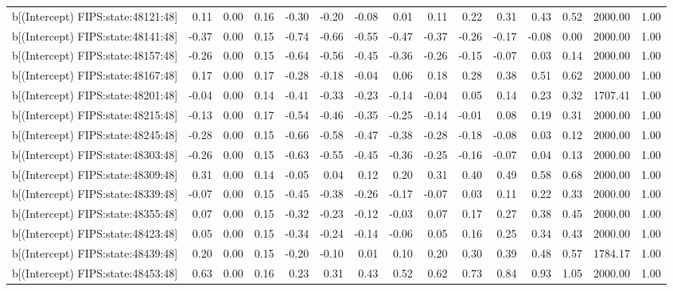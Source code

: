 \begin{table}[ht]
\begin{tabular}{rrrrrrrrrrrrrrr}
  b[(Intercept) FIPS:state:48121:48] & 0.11 & 0.00 & 0.16 & -0.30 & -0.20 & -0.08 & 0.01 & 0.11 & 0.22 & 0.31 & 0.43 & 0.52 & 2000.00 & 1.00 \\ 
  b[(Intercept) FIPS:state:48141:48] & -0.37 & 0.00 & 0.15 & -0.74 & -0.66 & -0.55 & -0.47 & -0.37 & -0.26 & -0.17 & -0.08 & 0.00 & 2000.00 & 1.00 \\ 
  b[(Intercept) FIPS:state:48157:48] & -0.26 & 0.00 & 0.15 & -0.64 & -0.56 & -0.45 & -0.36 & -0.26 & -0.15 & -0.07 & 0.03 & 0.14 & 2000.00 & 1.00 \\ 
  b[(Intercept) FIPS:state:48167:48] & 0.17 & 0.00 & 0.17 & -0.28 & -0.18 & -0.04 & 0.06 & 0.18 & 0.28 & 0.38 & 0.51 & 0.62 & 2000.00 & 1.00 \\ 
  b[(Intercept) FIPS:state:48201:48] & -0.04 & 0.00 & 0.14 & -0.41 & -0.33 & -0.23 & -0.14 & -0.04 & 0.05 & 0.14 & 0.23 & 0.32 & 1707.41 & 1.00 \\ 
  b[(Intercept) FIPS:state:48215:48] & -0.13 & 0.00 & 0.17 & -0.54 & -0.46 & -0.35 & -0.25 & -0.14 & -0.01 & 0.08 & 0.19 & 0.31 & 2000.00 & 1.00 \\ 
  b[(Intercept) FIPS:state:48245:48] & -0.28 & 0.00 & 0.15 & -0.66 & -0.58 & -0.47 & -0.38 & -0.28 & -0.18 & -0.08 & 0.03 & 0.12 & 2000.00 & 1.00 \\ 
  b[(Intercept) FIPS:state:48303:48] & -0.26 & 0.00 & 0.15 & -0.63 & -0.55 & -0.45 & -0.36 & -0.25 & -0.16 & -0.07 & 0.04 & 0.13 & 2000.00 & 1.00 \\ 
  b[(Intercept) FIPS:state:48309:48] & 0.31 & 0.00 & 0.14 & -0.05 & 0.04 & 0.12 & 0.20 & 0.31 & 0.40 & 0.49 & 0.58 & 0.68 & 2000.00 & 1.00 \\ 
  b[(Intercept) FIPS:state:48339:48] & -0.07 & 0.00 & 0.15 & -0.45 & -0.38 & -0.26 & -0.17 & -0.07 & 0.03 & 0.11 & 0.22 & 0.33 & 2000.00 & 1.00 \\ 
  b[(Intercept) FIPS:state:48355:48] & 0.07 & 0.00 & 0.15 & -0.32 & -0.23 & -0.12 & -0.03 & 0.07 & 0.17 & 0.27 & 0.38 & 0.45 & 2000.00 & 1.00 \\ 
  b[(Intercept) FIPS:state:48423:48] & 0.05 & 0.00 & 0.15 & -0.34 & -0.24 & -0.14 & -0.06 & 0.05 & 0.16 & 0.25 & 0.34 & 0.43 & 2000.00 & 1.00 \\ 
  b[(Intercept) FIPS:state:48439:48] & 0.20 & 0.00 & 0.15 & -0.20 & -0.10 & 0.01 & 0.10 & 0.20 & 0.30 & 0.39 & 0.48 & 0.57 & 1784.17 & 1.00 \\ 
  b[(Intercept) FIPS:state:48453:48] & 0.63 & 0.00 & 0.16 & 0.23 & 0.31 & 0.43 & 0.52 & 0.62 & 0.73 & 0.84 & 0.93 & 1.05 & 2000.00 & 1.00 \\ 

\end{tabular}
\end{table}
